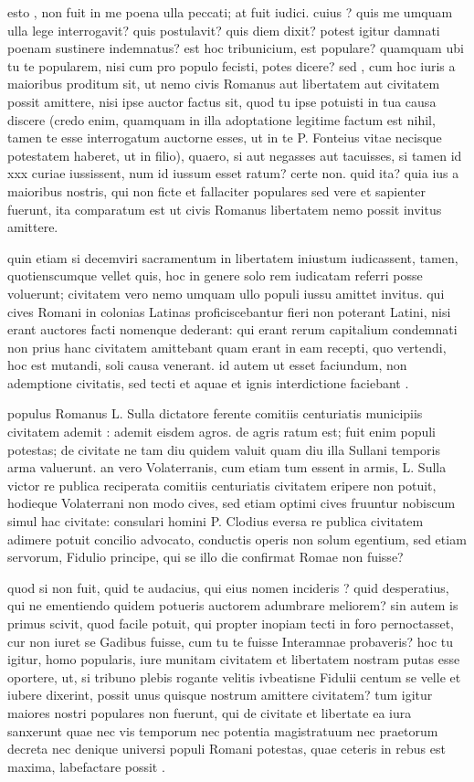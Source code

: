 esto , non fuit in me poena ulla peccati; at fuit iudici. cuius ? quis me umquam ulla lege interrogavit? quis postulavit? quis diem dixit? potest igitur damnati poenam sustinere indemnatus? est hoc tribunicium, est populare? quamquam ubi tu te popularem, nisi cum pro populo fecisti, potes dicere? sed , cum hoc iuris a maioribus proditum sit, ut nemo civis Romanus aut libertatem aut civitatem possit amittere, nisi ipse auctor factus sit, quod tu ipse potuisti in tua causa discere (credo enim, quamquam in illa adoptatione legitime factum est nihil, tamen te esse interrogatum auctorne esses, ut in te P. Fonteius vitae necisque potestatem haberet, ut in filio), quaero, si aut negasses aut tacuisses, si tamen id xxx curiae iussissent, num id iussum esset ratum? certe non. quid ita? quia ius a maioribus nostris, qui non ficte et fallaciter populares sed vere et sapienter fuerunt, ita comparatum est ut civis Romanus libertatem nemo possit invitus amittere.

 quin etiam si decemviri sacramentum in libertatem iniustum iudicassent, tamen, quotienscumque vellet quis, hoc in genere solo rem iudicatam referri posse voluerunt; civitatem vero nemo umquam ullo populi iussu amittet invitus. qui cives Romani in colonias Latinas proficiscebantur fieri non poterant Latini, nisi erant auctores facti nomenque dederant: qui erant rerum capitalium condemnati non prius hanc civitatem amittebant quam erant in eam recepti, quo vertendi, hoc est mutandi, soli causa venerant. id autem ut esset faciundum, non ademptione civitatis, sed tecti et aquae et ignis interdictione faciebant .

 populus Romanus L. Sulla dictatore ferente comitiis centuriatis municipiis civitatem ademit : ademit eisdem agros. de agris ratum est; fuit enim populi potestas; de civitate ne tam diu quidem valuit quam diu illa Sullani temporis arma valuerunt. an vero Volaterranis, cum etiam tum essent in armis, L. Sulla victor re publica reciperata comitiis centuriatis civitatem eripere non potuit, hodieque Volaterrani non modo cives, sed etiam optimi cives fruuntur nobiscum simul hac civitate: consulari homini P. Clodius eversa re publica civitatem adimere potuit concilio advocato, conductis operis non solum egentium, sed etiam servorum, Fidulio principe, qui se illo die confirmat Romae non fuisse?

 quod si non fuit, quid te audacius, qui eius nomen incideris ? quid desperatius, qui ne ementiendo quidem potueris auctorem adumbrare meliorem? sin autem is primus scivit, quod facile potuit, qui propter inopiam tecti in foro pernoctasset, cur non iuret se Gadibus fuisse, cum tu te fuisse Interamnae probaveris? hoc tu igitur, homo popularis, iure munitam civitatem et libertatem nostram putas esse oportere, ut, si tribuno plebis rogante velitis ivbeatisne Fidulii centum se velle et iubere dixerint, possit unus quisque nostrum amittere civitatem? tum igitur maiores nostri populares non fuerunt, qui de civitate et libertate ea iura sanxerunt quae nec vis temporum nec potentia magistratuum nec praetorum decreta nec denique universi populi Romani potestas, quae ceteris in rebus est maxima, labefactare possit .

